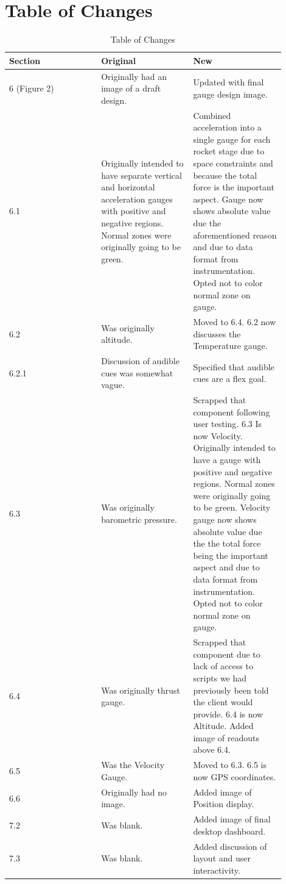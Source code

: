 \documentclass[journal,10pt,onecolumn,compsoc]{IEEEtran}
\begin{document}
\setlength{\parskip}{\baselineskip} 
\section{Table of Changes}

\begin{center}
\begin{table}[h!]
\begin{tabular}{|p{0.3\linewidth}|p{0.3\linewidth}|p{0.3\linewidth}|} 
	\hline
	\textbf{Section} & \textbf{Original} & \textbf{New} \\
	\hline
	6 (Figure 2) & Originally had an image of a draft design. & Updated with final gauge design image. \\ 
	\hline
	6.1 & Originally intended to have separate vertical and horizontal acceleration gauges with positive and negative regions. Normal zones were originally going to be green. & Combined acceleration into a single gauge for each rocket stage due to space constraints and because the total force is the important aspect. Gauge now shows absolute value due the aforementioned reason and due to data format from instrumentation. Opted not to color normal zone on gauge.\\
	\hline
  6.2 & Was originally altitude. & Moved to 6.4. 6.2 now discusses the Temperature gauge.\\
  \hline
  6.2.1 & Discussion of audible cues was somewhat vague. & Specified that audible cues are a flex goal. \\
  \hline
	6.3 & Was originally barometric pressure. & Scrapped that component following user testing. 6.3 Is now Velocity. Originally intended to have a gauge with positive and negative regions. Normal zones were originally going to be green. Velocity gauge now shows absolute value due the the total force being the important aspect and due to data format from instrumentation. Opted not to color normal zone on gauge.\\
	\hline
  6.4 & Was originally thrust gauge. & Scrapped that component due to lack of access to scripts we had previously been told the client would provide. 6.4 is now Altitude. Added image of readouts above 6.4.\\
  \hline
  6.5 & Was the Velocity Gauge. & Moved to 6.3. 6.5 is now GPS coordinates. \\
	\hline
  6.6 & Originally had no image. & Added image of Position display. \\
  \hline
  7.2 & Was blank. & Added image of final desktop dashboard. \\
  \hline
  7.3 & Was blank. & Added discussion of layout and user interactivity.\\
  \hline
\end{tabular}
\caption{Table of Changes}
\label{table:1}
\end{table}
\end{center}
\newpage
\end{document}
